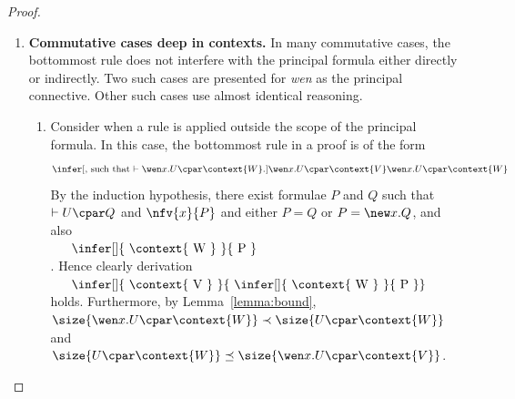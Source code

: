 \documentclass[UKenglish,acmsmall,authorversion]{acmart}
\newcommand{\fullproof}[1]{} %
\theoremstyle{plain}
\begin{document}
{\begin{proof}
\begin{enumerate}[label=\textbf{\Alph*},ref=\Alph*,leftmargin=*]
{}  %



\item \textbf{Commutative cases deep in contexts.}
In many commutative cases, the bottommost rule does not interfere with the principal formula either directly or indirectly. Two such cases are presented for \textit{wen} as the principal connective. Other such cases use almost identical reasoning.

\begin{enumerate}[label*=\textbf{.\arabic*}]

\item Consider when a rule is applied outside the scope of the principal formula.
%
In this case, the bottommost rule in a proof is of the form
\[
\infer[\mbox{, such that $\vdash \wen x. U \cpar \context{ W }$.}]{
\wen x. U \cpar \context{ V }
}{
 \wen x. U \cpar \context{ W }
}
\]
By the induction hypothesis, there exist formulae $P$ and $Q$ such that $\vdash U \cpar Q$ and $\nfv{x}{P}$ and either $P = Q$ or $P = \new x. Q$, and also $
\vcenter{\infer[]{
\context{ W }
}{
 P
}}
$.
Hence clearly derivation $
\vcenter{\infer[]{
\context{ V }
}{
\infer[]{
 \context{ W } 
}{
  P
}}}
$
 holds.
Furthermore, by Lemma~\ref{lemma:bound}, $\size{ \wen x. U \cpar \context{ W }} \prec \size{ U \cpar \context{ W }}$ 
and $\size{ U \cpar \context{ W }} \preceq \size{\wen x. U \cpar \context{ V }}$.

\fullproof{
Assume that the following application of any rule
$
\infer[]{
\left( T \cseq U \right) \cpar \context{ V }
}{
 \left( T \cseq U \right) \cpar \context{ W }
}$
is the bottommost rule in a proof,
such that $\vdash \left( T \cseq U \right) \cpar \context{ W }$.
By the induction hypothesis, there exist $n$-ary killing context $\tcontext{}$ and formulae $Q_i$ and $R_i$ such that $\vdash T \cpar Q_i$ and $\vdash U \cpar R_i$, for $1 \leq i \leq n$, such that $
\infer[]{
\context{ W } 
}{
\tcontext{ Q_1 \cseq R_1, \ldots, Q_n \cseq R_n }
}
$.
Hence, the derivation 
$
\infer[]{
\context{ V }
}{
\infer[]{
 \context{ W } 
 \tcontext{ Q_1 \cseq R_1, \ldots, Q_n \cseq R_n }
}}
$
holds, satisfying the induction invariant.


}
\end{enumerate}
\end{enumerate}
\end{proof}}
\end{document}
